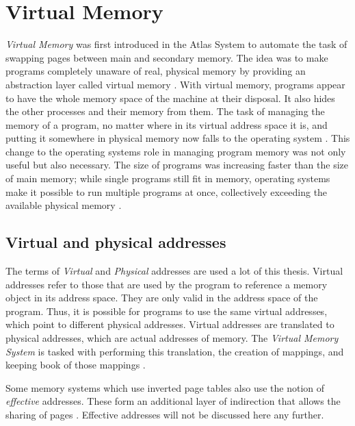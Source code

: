\section{Virtual Memory}
\textit{Virtual Memory} was first introduced in the Atlas System \cite{fotheringham1961dynamic} to
automate the task of swapping pages between main and secondary memory.
The idea was to make programs completely unaware of real, physical memory by providing
an abstraction layer called virtual memory \cite{denning1996virtual}.
With virtual memory, programs appear to have the whole memory space of the machine at their disposal. It also
hides the other processes and their memory from them.
The task of managing the memory of a program, no matter where in its virtual address space it is, and putting it somewhere
in physical memory now falls to the operating system \cite{denning1970virtual}.
This change to the operating systems role in managing program memory was not only useful but also necessary. The size of programs was increasing faster than the size of main
memory; while single programs
still fit in memory, operating systems make it possible to run multiple programs at once, collectively exceeding
the available physical memory \cite{tanenbaumOS}.

\subsection{Virtual and physical addresses}
The terms of \textit{Virtual} and \textit{Physical} addresses are used a lot of this thesis.
Virtual addresses refer to those that are used by the program to reference a memory object in its address
space. They are only valid in the address space of the program. Thus, it is possible for programs to use the same
virtual addresses, which point to different physical addresses.
Virtual addresses are translated to physical addresses, which are actual addresses of memory. The \textit{Virtual Memory System} is tasked with performing this translation, the creation of mappings,
and keeping book of those mappings \cite{denning1996virtual}.

Some memory systems which use inverted page tables also use the notion of \textit{effective} addresses.
These form an additional layer of indirection that allows the sharing of pages \cite{jacob1998virtualissues}.
Effective addresses will not be discussed here any further.


